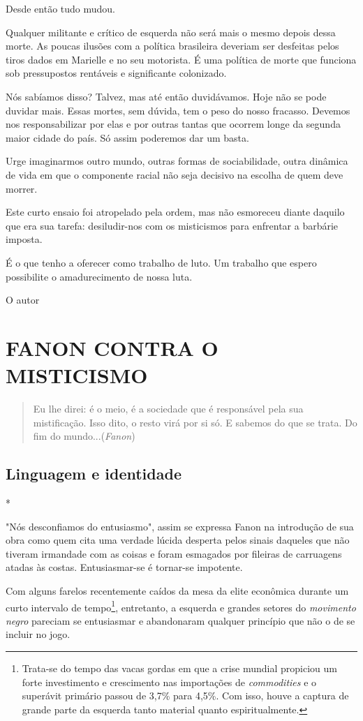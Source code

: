 Desde então tudo mudou.

Qualquer militante e crítico de esquerda não será mais o mesmo depois
dessa morte. As poucas ilusões com a política brasileira deveriam ser
desfeitas pelos tiros dados em Marielle e no seu motorista. É uma
política de morte que funciona sob pressupostos rentáveis e significante
colonizado.

Nós sabíamos disso? Talvez, mas até então duvidávamos. Hoje não se pode
duvidar mais. Essas mortes, sem dúvida, tem o peso do nosso fracasso.
Devemos nos responsabilizar por elas e por outras tantas que ocorrem
longe da segunda maior cidade do país. Só assim poderemos dar um basta.

Urge imaginarmos outro mundo, outras formas de sociabilidade, outra
dinâmica de vida em que o componente racial não seja decisivo na escolha
de quem deve morrer.

Este curto ensaio foi atropelado pela ordem, mas não esmoreceu diante
daquilo que era sua tarefa: desiludir-nos com os misticismos para
enfrentar a barbárie imposta.

É o que tenho a oferecer como trabalho de luto. Um trabalho que espero
possibilite o amadurecimento de nossa luta.

O autor

\part{FANON CONTRA O MISTICISMO}

\begin{quote}
Eu lhe direi: é o meio, é a sociedade que é responsável pela sua
mistificação. Isso dito, o resto virá por si só. E sabemos do que se
trata. Do fim do mundo...(\emph{Fanon})
\end{quote}

\chapter{Linguagem e identidade}

*

"Nós desconfiamos do entusiasmo", assim se expressa Fanon na introdução
de sua obra como quem cita uma verdade lúcida desperta pelos sinais
daqueles que não tiveram irmandade com as coisas e foram esmagados por
fileiras de carruagens atadas às costas. Entusiasmar-se é tornar-se
impotente.

Com alguns farelos recentemente caídos da mesa da elite econômica
durante um curto intervalo de tempo\footnote{Trata-se do tempo das vacas
  gordas em que a crise mundial propiciou um forte investimento e
  crescimento nas importações de \emph{commodities} e o superávit
  primário passou de 3,7\% para 4,5\%. Com isso, houve a captura de
  grande parte da esquerda tanto material quanto espiritualmente.},
entretanto, a esquerda e grandes setores do \emph{movimento negro}
pareciam se entusiasmar e abandonaram qualquer princípio que não o de se
incluir no jogo.

